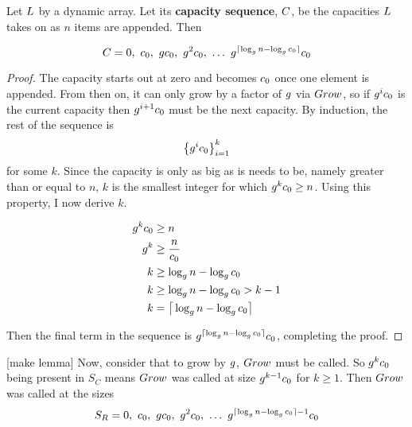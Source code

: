\begin{lemma}
\label{lem:CapacitySequence}
	Let $L$ by a dynamic array. Let its \textbf{capacity sequence}, $C$, be the capacities $L$ takes on as $n$ items are appended. Then
	
	$$
	\VarCapacitySequence = 0,\ \VarInitCapacity,\ \VarGrowthFactor\VarInitCapacity,\ \VarGrowthFactor^2\VarInitCapacity,\ \ldots\ \VarGrowthFactor^{\lceil \log_{\VarGrowthFactor} n - \log_{\VarGrowthFactor} \VarInitCapacity \rceil}\VarInitCapacity
	$$
\end{lemma}


\begin{proof}
	The capacity starts out at zero and becomes $c_0$ once one element is appended. From then on, it can only grow by a factor of $g$ via $Grow$, so if $g^ic_0$ is the current capacity then $g^{i + 1}c_0$ must be the next capacity. By induction, the rest of the sequence is $$\left\{ g^ic_0 \right\}_{i = 1}^k$$ for some $k$. Since the capacity is only as big as is needs to be, namely greater than or equal to $n$, $k$ is the smallest integer for which $g^kc_0 \geq n$. Using this property, I now derive $k$.
	
	\begin{align*}
	g^kc_0 &\geq n\\
	g^k &\geq \frac{n}{c_0}\\
	k &\geq \log_{g} n - \log_{g} c_0\\
	k &\geq \log_{g} n - \log_{g} c_0 > k - 1\\
	k &= \big\lceil \log_{g} n - \log_{g} c_0 \big\rceil
	\end{align*}
	
	Then the final term in the sequence is $g^{\lceil \log_{g} n - \log_{g} c_0 \rceil}c_0$, completing the proof.
\end{proof}

[make lemma]
Now, consider that to grow by $g$, $Grow$ must be called. So $g^kc_0$ being present in $S_C$ means $Grow$ was called at size $g^{k - 1}c_0$ for $k \geq 1$. Then $Grow$ was called at the sizes $$S_R = 0,\ \VarInitCapacity,\ \VarGrowthFactor\VarInitCapacity,\ \VarGrowthFactor^2\VarInitCapacity,\ \ldots\ \VarGrowthFactor^{\lceil \log_{\VarGrowthFactor} n - \log_{\VarGrowthFactor} \VarInitCapacity \rceil - 1}\VarInitCapacity$$

